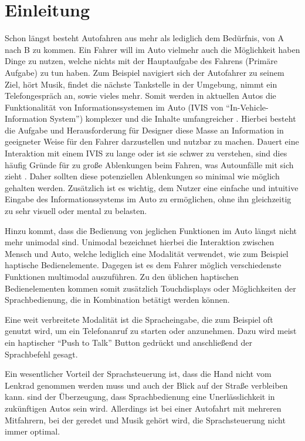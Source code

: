 \chapter{Einleitung}
Schon längst besteht Autofahren aus mehr als lediglich dem Bedürfnis, von A nach B zu kommen.
Ein Fahrer will im Auto vielmehr auch die Möglichkeit haben Dinge zu nutzen, welche nichts mit der Hauptaufgabe des Fahrens (Primäre Aufgabe) zu tun haben.
Zum Beispiel navigiert sich der Autofahrer zu seinem Ziel, hört Musik, findet die nächste Tankstelle in der Umgebung, nimmt ein Telefongespräch an, sowie vieles mehr.
Somit werden in aktuellen Autos die Funktionalität von Informationssystemen im Auto (IVIS von "`In-Vehicle-Information System"') komplexer und die Inhalte umfangreicher \citep{Kern:2009}.
Hierbei besteht die Aufgabe und Herausforderung für Designer diese Masse an Information in geeigneter Weise für den Fahrer darzustellen und nutzbar zu machen.
Dauert eine Interaktion mit einem IVIS zu lange oder ist sie schwer zu verstehen, sind dies häufig Gründe für zu große Ablenkungen beim Fahren, was Autounfälle mit sich zieht \citep{neale2005overview}.
Daher sollten diese potenziellen Ablenkungen so minimal wie möglich gehalten werden.
Zusätzlich ist es wichtig, dem Nutzer eine einfache und intuitive Eingabe des Informationssystems im Auto zu ermöglichen, ohne ihn gleichzeitig zu sehr visuell oder mental zu belasten. 

Hinzu kommt, dass die Bedienung von jeglichen Funktionen im Auto längst nicht mehr unimodal sind.
Unimodal bezeichnet hierbei die Interaktion zwischen Mensch und Auto, welche lediglich eine Modalität verwendet, wie zum Beispiel haptische Bedienelemente.
Dagegen ist es dem Fahrer möglich verschiedenste Funktionen multimodal auszuführen.
Zu den üblichen haptischen Bedienelementen kommen somit zusätzlich Touchdisplays oder Möglichkeiten der Sprachbedienung, die in Kombination betätigt werden können. 
 
Eine weit verbreitete Modalität ist die Spracheingabe, die zum Beispiel oft genutzt wird, um ein Telefonanruf zu starten oder anzunehmen. Dazu wird meist ein haptischer "`Push to Talk"' Button gedrückt und anschließend der Sprachbefehl gesagt. 

Ein wesentlicher Vorteil der Sprachsteuerung ist, dass die Hand nicht vom Lenkrad genommen werden muss und auch der Blick auf der Straße verbleiben kann.
\citet{maciej2009comparison} sind der Überzeugung, dass Sprachbedienung eine Unerlässlichkeit in zukünftigen Autos sein wird.
Allerdings ist bei einer Autofahrt mit mehreren Mitfahrern, bei der geredet und Musik gehört wird, die Sprachsteuerung nicht immer optimal. 


